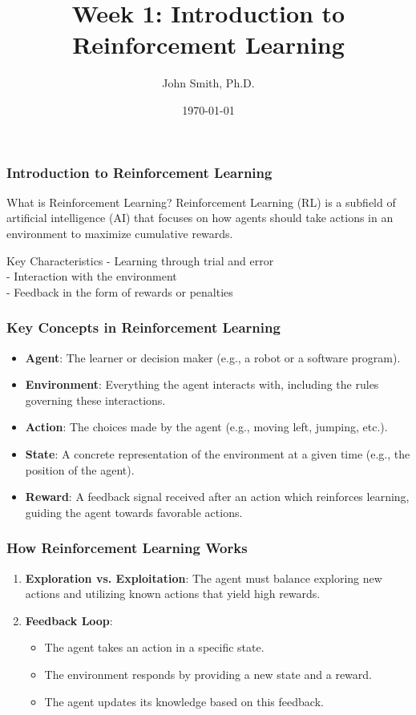 \documentclass[aspectratio=169]{beamer}
\title[Introduction to Reinforcement Learning]{Week 1: Introduction to Reinforcement Learning}
\author[J. Smith]{John Smith, Ph.D.}
\institute[University Name]{
  Department of Computer Science\\
  University Name\\
  \vspace{0.3cm}
  Email: email@university.edu\\
  Website: www.university.edu
}
\date{\today}
\begin{document}
\frame{\titlepage}

\begin{frame}[fragile]
    \frametitle{Introduction to Reinforcement Learning}
    \begin{block}{What is Reinforcement Learning?}
        Reinforcement Learning (RL) is a subfield of artificial intelligence (AI) that focuses on how agents should take actions in an environment to maximize cumulative rewards.
    \end{block}
    \begin{block}{Key Characteristics}
        - Learning through trial and error \\
        - Interaction with the environment \\
        - Feedback in the form of rewards or penalties
    \end{block}
\end{frame}

\begin{frame}[fragile]
    \frametitle{Key Concepts in Reinforcement Learning}
    \begin{itemize}
        \item \textbf{Agent}: The learner or decision maker (e.g., a robot or a software program).
        \item \textbf{Environment}: Everything the agent interacts with, including the rules governing these interactions.
        \item \textbf{Action}: The choices made by the agent (e.g., moving left, jumping, etc.).
        \item \textbf{State}: A concrete representation of the environment at a given time (e.g., the position of the agent).
        \item \textbf{Reward}: A feedback signal received after an action which reinforces learning, guiding the agent towards favorable actions.
    \end{itemize}
\end{frame}

\begin{frame}[fragile]
    \frametitle{How Reinforcement Learning Works}
    \begin{enumerate}
        \item \textbf{Exploration vs. Exploitation}: The agent must balance exploring new actions and utilizing known actions that yield high rewards.
        \item \textbf{Feedback Loop}:
            \begin{itemize}
                \item The agent takes an action in a specific state.
                \item The environment responds by providing a new state and a reward.
                \item The agent updates its knowledge based on this feedback.
            \end{itemize}
    \end{enumerate}
\end{frame}
\end{document}
